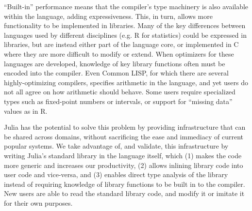 \documentclass[11pt]{sigplanconf}
\begin{document}

``Built-in'' performance means that the compiler's type machinery is also
available within the language, adding expressiveness. This, in turn,
allows more functionality to be implemented in
libraries. Many of the key differences between languages used by different
disciplines (e.g. R for statistics) could be expressed in libraries, but
are instead either part of the language core, or implemented in C where
they are more difficult to modify or extend. When optimizers for these
languages are developed, knowledge of key library functions often must be
encoded into the compiler. Even Common LISP, for which there are several
highly-optimizing compilers, specifies arithmetic in the language, and
yet users do not all agree on how arithmetic should behave. Some
users require specialized types such as fixed-point numbers or intervals,
or support for ``missing data'' values as in R.

Julia has the potential to solve this problem by providing infrastructure
that can be shared across domains, without sacrificing the ease and
immediacy of current popular systems.
We take advantage of, and validate, this infrastructure by writing Julia's
standard library in the language itself, which (1) makes the code more
generic and increases our productivity, (2) allows inlining library
code into user code and vice-versa, and (3) enables direct type analysis
of the library instead of requiring knowledge of library functions to
be built in to the compiler. New users are able to read the standard
library code, and modify it or imitate it for their own purposes.


\end{document}

